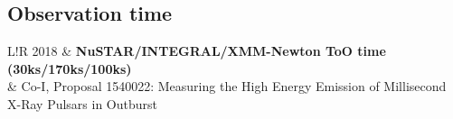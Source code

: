 \documentclass[10pt]{article}
\newcommand\VRule{\color{lightgray}\vrule width 0.5pt}
\begin{document}
%

\vspace{-5pt}
\subsection*{\phantom{sub} Observation time}
\begin{tabular}{L!{\VRule}R}
    2018 & \textbf{NuSTAR/INTEGRAL/XMM-Newton ToO time (30ks/170ks/100ks)} \\
         &  \small{Co-I, Proposal 1540022: Measuring the High Energy Emission of Millisecond X-Ray Pulsars in Outburst} \\[1ex]
\end{tabular}
\end{document}
